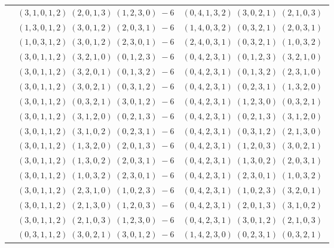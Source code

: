 \documentclass[11pt]{article}
\begin{document}
\begin{longtable}[l]{|c|c|c|}
 \cline{2-3} 
 & $(3 ,1 ,0 ,1 ,2) \;(2 ,0 ,1 ,3) \;(1 ,2 ,3 ,0) \;-6$ & $(0 ,4 ,1 ,3 ,2) \;(3 ,0 ,2 ,1) \;(2 ,1 ,0 ,3) \;$\\ 
 \cline{2-3} 
 & $(1 ,3 ,0 ,1 ,2) \;(3 ,0 ,1 ,2) \;(2 ,0 ,3 ,1) \;-6$ & $(1 ,4 ,0 ,3 ,2) \;(0 ,3 ,2 ,1) \;(2 ,0 ,3 ,1) \;$\\ 
 \cline{2-3} 
 & $(1 ,0 ,3 ,1 ,2) \;(3 ,0 ,1 ,2) \;(2 ,3 ,0 ,1) \;-6$ & $(2 ,4 ,0 ,3 ,1) \;(0 ,3 ,2 ,1) \;(1 ,0 ,3 ,2) \;$\\ 
 \cline{2-3} 
 & $(3 ,0 ,1 ,1 ,2) \;(3 ,2 ,1 ,0) \;(0 ,1 ,2 ,3) \;-6$ & $(0 ,4 ,2 ,3 ,1) \;(0 ,1 ,2 ,3) \;(3 ,2 ,1 ,0) \;$\\ 
 \cline{2-3} 
 & $(3 ,0 ,1 ,1 ,2) \;(3 ,2 ,0 ,1) \;(0 ,1 ,3 ,2) \;-6$ & $(0 ,4 ,2 ,3 ,1) \;(0 ,1 ,3 ,2) \;(2 ,3 ,1 ,0) \;$\\ 
 \cline{2-3} 
 & $(3 ,0 ,1 ,1 ,2) \;(3 ,0 ,2 ,1) \;(0 ,3 ,1 ,2) \;-6$ & $(0 ,4 ,2 ,3 ,1) \;(0 ,2 ,3 ,1) \;(1 ,3 ,2 ,0) \;$\\ 
 \cline{2-3} 
 & $(3 ,0 ,1 ,1 ,2) \;(0 ,3 ,2 ,1) \;(3 ,0 ,1 ,2) \;-6$ & $(0 ,4 ,2 ,3 ,1) \;(1 ,2 ,3 ,0) \;(0 ,3 ,2 ,1) \;$\\ 
 \cline{2-3} 
 & $(3 ,0 ,1 ,1 ,2) \;(3 ,1 ,2 ,0) \;(0 ,2 ,1 ,3) \;-6$ & $(0 ,4 ,2 ,3 ,1) \;(0 ,2 ,1 ,3) \;(3 ,1 ,2 ,0) \;$\\ 
 \cline{2-3} 
 & $(3 ,0 ,1 ,1 ,2) \;(3 ,1 ,0 ,2) \;(0 ,2 ,3 ,1) \;-6$ & $(0 ,4 ,2 ,3 ,1) \;(0 ,3 ,1 ,2) \;(2 ,1 ,3 ,0) \;$\\ 
 \cline{2-3} 
 & $(3 ,0 ,1 ,1 ,2) \;(1 ,3 ,2 ,0) \;(2 ,0 ,1 ,3) \;-6$ & $(0 ,4 ,2 ,3 ,1) \;(1 ,2 ,0 ,3) \;(3 ,0 ,2 ,1) \;$\\ 
 \cline{2-3} 
 & $(3 ,0 ,1 ,1 ,2) \;(1 ,3 ,0 ,2) \;(2 ,0 ,3 ,1) \;-6$ & $(0 ,4 ,2 ,3 ,1) \;(1 ,3 ,0 ,2) \;(2 ,0 ,3 ,1) \;$\\ 
 \cline{2-3} 
 & $(3 ,0 ,1 ,1 ,2) \;(1 ,0 ,3 ,2) \;(2 ,3 ,0 ,1) \;-6$ & $(0 ,4 ,2 ,3 ,1) \;(2 ,3 ,0 ,1) \;(1 ,0 ,3 ,2) \;$\\ 
 \cline{2-3} 
 & $(3 ,0 ,1 ,1 ,2) \;(2 ,3 ,1 ,0) \;(1 ,0 ,2 ,3) \;-6$ & $(0 ,4 ,2 ,3 ,1) \;(1 ,0 ,2 ,3) \;(3 ,2 ,0 ,1) \;$\\ 
 \cline{2-3} 
 & $(3 ,0 ,1 ,1 ,2) \;(2 ,1 ,3 ,0) \;(1 ,2 ,0 ,3) \;-6$ & $(0 ,4 ,2 ,3 ,1) \;(2 ,0 ,1 ,3) \;(3 ,1 ,0 ,2) \;$\\ 
 \cline{2-3} 
 & $(3 ,0 ,1 ,1 ,2) \;(2 ,1 ,0 ,3) \;(1 ,2 ,3 ,0) \;-6$ & $(0 ,4 ,2 ,3 ,1) \;(3 ,0 ,1 ,2) \;(2 ,1 ,0 ,3) \;$\\ 
 \cline{2-3} 
 & $(0 ,3 ,1 ,1 ,2) \;(3 ,0 ,2 ,1) \;(3 ,0 ,1 ,2) \;-6$ & $(1 ,4 ,2 ,3 ,0) \;(0 ,2 ,3 ,1) \;(0 ,3 ,2 ,1) \;$\\ 

\end{longtable}
\end{document}
